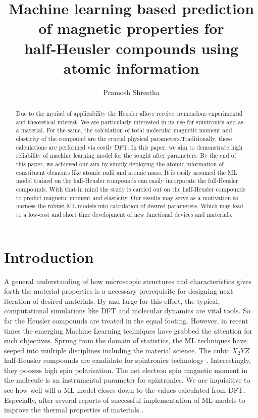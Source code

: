 \documentclass{article}
\title{Machine learning based prediction of magnetic properties for half‑Heusler compounds using atomic information}
\author{Pramosh Shrestha}
\begin{document}
\maketitle

\begin{abstract}
Due to the myriad of applicability the Heusler alloys receive tremendous experimental and theoretical interest. We are particularly interested in its use for spintronics and as a material. For the same, the calculation of total molecular magnetic moment and elasticity of the compound are the crucial physical parameters.Traditionally, these calculations are performed via costly DFT. In this paper, we aim to demonstrate high reliability of machine learning model for the sought after parameters. By the end of this paper, we achieved our aim by simply deploying the atomic information of constituent elements like atomic radii and atomic mass. It is easily assumed the ML model trained on the half-Heusler compounds can easily incorporate the full-Heusler compounds. With that in mind the study is carried out on the half-Heusler compounds to predict magnetic moment and elasticity. Our results may serve as a motivation to harness the robust ML models into calculation of desired parameters. Which may lead to a low‑cost and short time development of new functional devices and materials.
\end{abstract}

\section{Introduction}
A general understanding of how microscopic structures and characteristics gives forth the material properties is a necessary prerequisite for designing next iteration of desired materials. By and large for this effort, the typical, computational simulations like DFT and molecular dynamics are vital tools. So far the Heusler compounds are treated in the equal footing\cite{srivastava2020investigation, khandy2017dft}. However, in recent times the emerging Machine Learning techniques have grabbed the attention for such objectives. Sprung from the domain of statistics, the ML techniques have seeped into multiple disciplines including the material science. The cubic ${X_2YZ}$ half-Heusler compounds are candidate for spintronics technology \cite{de1983new, feng2014first, zhang2017two, ma2017computational, dehghan2019d0}. Interestingly, they possess high spin polarisation. The net electron spin magnetic moment in the molecule is an instrumental parameter for spintronics. We are inquisitive to see how well will a ML model closes down to the values calculated from DFT. Especially, after several reports of successful implementation of ML models to improve the thermal properties of materials \cite{wan2019materials, ouyang2020accuracy, ouyang2021machine, wang2021prediction, miyazaki2021machine}.
\end{document}
